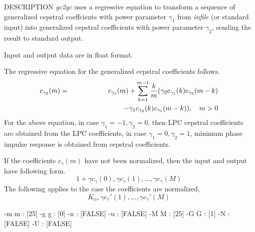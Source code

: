 \begin{qsection}{DESCRIPTION}
{\em gc2gc} uses a regressive equation 
to transform a sequence of generalized cepstral coeffcients 
with power parameter $\gamma_1$ from {\em infile} (or standard input)
into generalized cepstral coefficients with power parameter $\gamma_2$, 
sending the result to standard output.

Input and output data are in float format.

The regressive equation for the generalized cepstral coefficients 
follows.
\begin{eqnarray*}
  c_{\gamma_2}(m) &=& c_{\gamma_1}(m) + \sum_{k=1}^{m-1}\frac{k}{m}
		      (\gamma_2 c_{\gamma_1}(k)c_{\gamma_2}(m-k) \nonumber\\
     		  & & \hspace{25mm} -\gamma_1 c_{\gamma_2}(k)
			c_{\gamma_1}(m-k)), ~~~m>0
\end{eqnarray*}
For the above equation, in case $\gamma_1=-1, \gamma_2=0$,
then LPC cepstral coefficients are obtained from the LPC coefficients,
in case $\gamma_1=0, \gamma_2=1$, minimum phase impulse response is
obtained from cepstral coefficients.

If the coefficients $c_\gamma(m)$ have not been normalized,
then the input and output have following form.
\begin{displaymath}
1+\gamma c_\gamma(0), \gamma c_\gamma(1), \ldots, \gamma c_\gamma(M)
\end{displaymath}
The following applies to the case the coefficients are normalized,
\begin{displaymath}
K_\alpha,\gamma c_\gamma'(1),\ldots, \gamma c_\gamma'(M)
\end{displaymath}

\end{qsection}

\begin{options}
       -m m  :   [25]
       -g g  :   [0]
       -n    :     [FALSE]
       -u    :     [FALSE]
       -M M  :  [25]
       -G G  :  [1]
       -N    :    [FALSE]
       -U    :    [FALSE]
\end{options}

